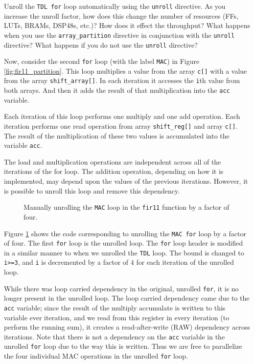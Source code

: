 \begin{exercise}
Unroll the \lstinline{TDL for} loop automatically using the \lstinline{unroll} directive. As you increase the unroll factor, how does this change the number of resources (FFs, LUTs, BRAMs, DSP48s, etc.)? How does it effect the throughput? What happens when you use the \lstinline{array_partition} directive in conjunction with the \lstinline{unroll} directive?  What happens if you do not use the \lstinline{unroll} directive?
\end{exercise}

Now, consider the second \lstinline{for} loop (with the label \lstinline{MAC}) in Figure \ref{fig:fir11_partition}. This loop multiplies a value from the array \lstinline{c[]} with a value from the array \lstinline{shift_array[]}. In each iteration it accesses the \lstinline{i}th value from both arrays. And then it adds the result of that multiplication into the \lstinline{acc} variable. 

Each iteration of this loop performs one multiply and one add operation. Each iteration performs one read operation from array \lstinline{shift_reg[]} and array \lstinline{c[]}. The result of the multiplication of these two values is accumulated into the variable \lstinline{acc}. 

The load and multiplication operations are independent across all of the iterations of the for loop. The addition operation, depending on how it is implemented, may depend upon the values of the previous iterations. However, it is possible to unroll this loop and remove this dependency.

\begin{figure}

\caption{ Manually unrolling the \lstinline{MAC} loop in the \lstinline{fir11} function by a factor of four.  }
\label{fig:fir11_unrollMAC}
\end{figure}

Figure \ref{fig:fir11_unrollMAC} shows the code corresponding to unrolling the \lstinline{MAC for} loop by a factor of four.  The first \lstinline{for} loop is the unrolled loop. The \lstinline{for} loop header is modified in a similar manner to when we unrolled the  \lstinline{TDL} loop. The bound is changed to \lstinline{i>=3}, and \lstinline{i} is decremented by a factor of $4$ for each iteration of the unrolled loop.

While there was loop carried dependency in the original, unrolled \lstinline{for}, it is no longer present in the unrolled loop. The loop carried dependency came due to the \lstinline{acc} variable; since the result of the multiply accumulate is written to this variable ever iteration, and we read from this register in every iteration (to perform the running sum), it creates a read-after-write (RAW) dependency across iterations.  Note that there is not a dependency on the \lstinline{acc} variable in the unrolled \lstinline{for} loop due to the way this is written. Thus we are free to parallelize the four individual MAC operations in the unrolled \lstinline{for} loop. 

